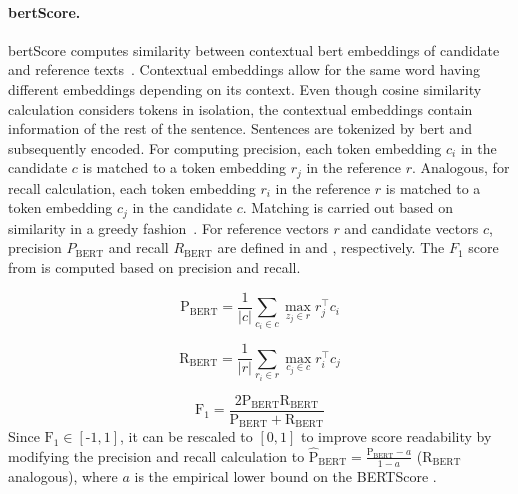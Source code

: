\paragraph{\acs{bert}Score.}
\acs{bert}Score computes similarity between contextual \ac{bert} embeddings of candidate and reference texts~\citep{hanna_fine_grained_2021}. 
Contextual embeddings allow for the same word having different embeddings depending on its context.
Even though cosine similarity calculation considers tokens in isolation, the contextual embeddings contain information of the rest of the sentence.
Sentences are tokenized by \ac{bert} and subsequently encoded.
For computing precision, each token embedding $c_i$ in the candidate $c$ is matched to a token embedding $r_j$ in the reference $r$.
Analogous, for recall calculation, each token embedding $r_i$ in the reference $r$ is matched to a token embedding $c_j$ in the candidate $c$.
Matching is carried out based on similarity in a greedy fashion~\citep{zhang_bertscore_2020}.
For reference vectors $r$ and candidate vectors $c$, precision $P_{\text{BERT}}$ and recall $R_{\text{BERT}}$ are defined in  and , respectively.
The $F_1$ score from  is computed based on precision and recall.

\begin{equation}
    \operatorname{P_{BERT}} = \frac{1}{|c|} \sum_{c_i \in c} \max_{z_j \in r} r_j^\top c_i
\label{eq:bert_p}
\end{equation}

\begin{equation}
    \operatorname{R_{BERT}} = \frac{1}{|r|} \sum_{r_i \in r} \max_{c_j \in c} r_i^\top c_j
\label{eq:bert_r}
\end{equation}

\begin{equation}
    \operatorname{F_1} = \frac{2  \operatorname{P_{BERT}}  \operatorname{R_{BERT}}}{\operatorname{P_{BERT}} + \operatorname{R_{BERT}}} 
\label{eq:bert_f1}
\end{equation}
Since $\operatorname{F_1} \in \left[\text{-}1,1\right]$, it can be rescaled to $[0,1]$ to improve score readability by modifying the precision and recall calculation 
to $\mathrm{\hat{P}_{BERT}} = \frac{\operatorname{P_{BERT}} - a}{1 - a}$ ($\operatorname{R_{BERT}}$ analogous), where $a$ is the empirical lower bound on the BERTScore \citep{zhang_bertscore_2020,hanna_fine_grained_2021}.


